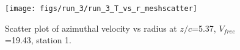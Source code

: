 \begin{figure}[H]
\centering
\texttt{[image: figs/run\_3/run\_3\_T\_vs\_r\_meshscatter]}
\caption{Scatter plot of azimuthal velocity vs radius at $z/c$=5.37, $V_{free}$=19.43, station 1.}
\label{fig:run_3_T_vs_r_meshscatter}
\end{figure}


